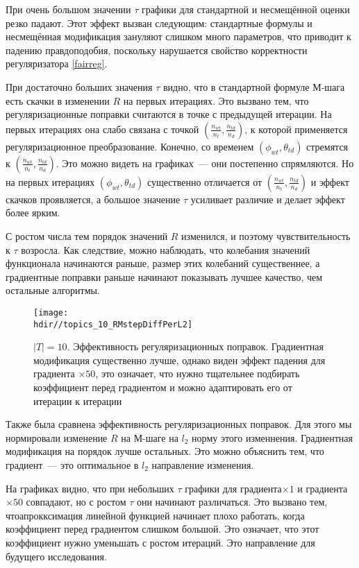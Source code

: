 \documentclass[12pt, twoside]{article}
\newcommand{\hdir}{.}
\begin{document}
При очень большом значении $\tau$ графики для стандартной и несмещённой оценки резко падают. Этот эффект вызван следующим: стандартные формулы и несмещённая модификация зануляют слишком много параметров, что приводит к падению правдоподобия, поскольку нарушается свойство корректности регуляризатора \ref{fairreg}.

При достаточно больших значения $\tau$ видно, что в стандартной  формуле М-шага есть скачки в изменении $R$ на первых итерациях. Это вызвано тем, что регуляризационные поправки считаются в точке с предыдущей итерации. На первых итерациях  она слабо связана с точкой $\left( \frac{n_{wt}}{{n_t}}, \frac{n_{td}}{n_d}\right)$, к которой применяется регуляризационное преобразование. Конечно, со временем $(\phi_{wt}, \theta_{td})$ стремятся к $\left( \frac{n_{wt}}{{n_t}}, \frac{n_{td}}{n_d}\right)$. Это можно видеть на графиках~--- они постепенно спрямляются. Но на первых итерациях $(\phi_{wt}, \theta_{td})$ существенно отличается  от $\left( \frac{n_{wt}}{{n_t}}, \frac{n_{td}}{n_d}\right)$  и эффект скачков  проявляется, а большое значение $\tau$ усиливает различие и делает эффект более ярким.

С ростом числа тем порядок значений $R$ изменился, и поэтому чувствительность к $\tau$ возросла. Как следствие, можно наблюдать, что колебания значений функционала начинаются раньше, размер этих колебаний существеннее, а градиентные поправки раньше начинают показывать лучшее качество, чем остальные алгоритмы.

\begin{figure}[!ht]
	\centering 
	\texttt{[image: \\hdir//topics\_10\_RMstepDiffPerL2]}
	\caption{$|T| = 10$.  Эффективность регуляризационных поправок. Градиентная модификация существенно лучше, однако виден эффект падения для градиента $\times50$, это означает, что нужно тщательнее подбирать коэффициент перед градиентом и можно адаптировать его от итерации к итерации}   
\end{figure}

Также была сравнена эффективность регуляризационных поправок. Для этого мы нормировали изменение $R$ на М-шаге на $l_2$ норму этого изменнения. Градиентная модификация на порядок лучше остальных. Это можно объяснить тем, что градиент~--- это оптимальное в $l_2$ направление изменения.

На графиках видно, что при небольших $\tau$ графики для градиента${\times}1$ и градиента${\times}50$ совпадают, но с ростом $\tau$ они начинают различаться. Это вызвано тем, чтоапрокксимация линейной функцией начинает плохо работать, когда коэффициент перед градиентом слишком большой. Это означает, что этот коэффициент нужно уменьшать с ростом итераций. Это направление для будущего исследования.
\end{document}
